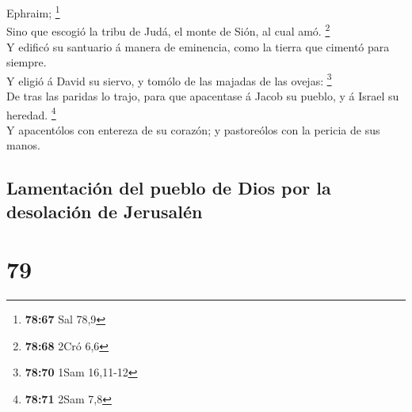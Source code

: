 Ephraim; \footnote{\textbf{78:67} Sal 78,9}\\
 Sino que escogió la tribu de Judá, el monte de Sión, al
cual amó. \footnote{\textbf{78:68} 2Cró 6,6}\\
 Y edificó su santuario á manera de eminencia, como la
tierra que cimentó para siempre.\\
 Y eligió á David su siervo, y tomólo de las majadas de las
ovejas: \footnote{\textbf{78:70} 1Sam 16,11-12}\\
 De tras las paridas lo trajo, para que apacentase á Jacob
su pueblo, y á Israel su heredad. \footnote{\textbf{78:71} 2Sam 7,8}\\
 Y apacentólos con entereza de su corazón; y pastoreólos
con la pericia de sus manos.

\hypertarget{lamentaciuxf3n-del-pueblo-de-dios-por-la-desolaciuxf3n-de-jerusaluxe9n}{%
\subsection{Lamentación del pueblo de Dios por la desolación de
Jerusalén}\label{lamentaciuxf3n-del-pueblo-de-dios-por-la-desolaciuxf3n-de-jerusaluxe9n}}

\hypertarget{section-78}{%
\section{79}\label{section-78}}

